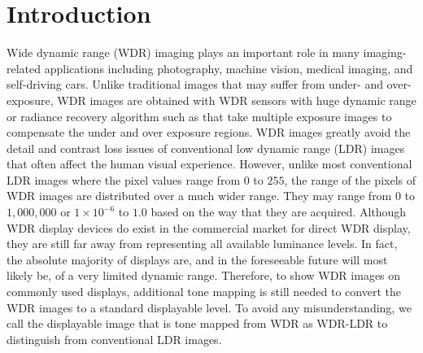 \documentclass[journal]{IEEEtran}
\begin{document}
\section{Introduction}
Wide dynamic range (WDR) imaging plays an important role in many imaging-related applications including photography, machine vision, medical imaging, and self-driving cars. Unlike traditional images that may suffer from under- and over-exposure, WDR images are obtained with WDR sensors with huge dynamic range \cite{yadid1997wide,spivak2009wide} or radiance recovery algorithm such as \cite{debevec1997recovering} that take multiple exposure images to compensate the under and over exposure regions.
WDR images greatly avoid the detail and contrast loss issues of conventional low dynamic range (LDR) images that often affect the human visual experience. However, unlike most conventional LDR images where the pixel values range from $0$ to $255$, the range of the pixels of WDR images are distributed over a much wider range. They may range from $0$ to $1,000,000$ or $1 \times 10^{-6}$ to $1.0$ based on the way that they are acquired. Although WDR display devices do exist in the commercial market for direct WDR display, they are still far away from representing all available luminance levels. In fact, the absolute majority of displays are, and in the foreseeable future will most likely be, of a very limited dynamic range. Therefore, to show WDR images on commonly used displays, additional tone mapping is still needed to convert the WDR images to a standard displayable level. To avoid any misunderstanding, we call the displayable image that is tone mapped from WDR as WDR-LDR to distinguish from conventional LDR images.

\end{document}
